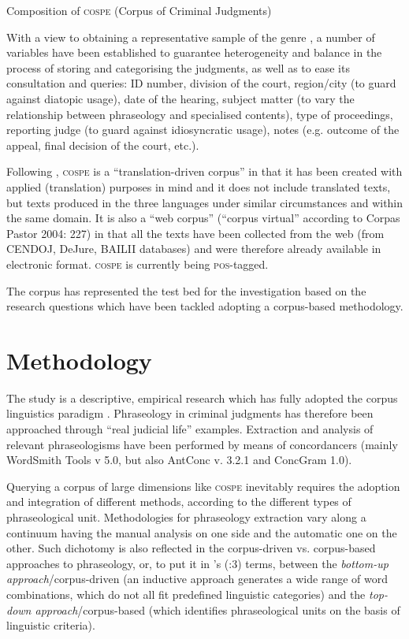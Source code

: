 \documentclass[output=paper]{LSP/langsci}
\begin{document}
\begin{table}
\caption{Composition of \textsc{cospe} (Corpus of Criminal Judgments)}
     \label{tab:6.3}
\end{table} 

With a view to obtaining a representative sample of the genre \citep[see][243]{Biber1993}, a number of variables have been established to guarantee heterogeneity and balance in the process of storing and categorising the judgments, as well as to ease its consultation and queries: ID number, division of the court, region/city (to guard against diatopic usage), date of the hearing, subject matter (to vary the relationship between phraseology and specialised contents), type of proceedings, reporting judge (to guard against idiosyncratic usage), notes (e.g. outcome of the appeal, final decision of the court, etc.).

Following \citet[105-107]{Zanettin2012}, \textsc{cospe} is a “translation-driven corpus” in that it has been created with applied (translation) purposes in mind and it does not include translated texts, but texts produced in the three languages under similar circumstances and within the same domain. It is also a “web corpus” (“corpus virtual” according to Corpas Pastor 2004: 227) in that all the texts have been collected from the web (from CENDOJ, DeJure, BAILII databases) and were therefore already available in electronic format. \textsc{cospe} is currently being \textsc{pos}-tagged.

The corpus has represented the test bed for the investigation based on the research questions which have been tackled adopting a corpus-based methodology.

\section{Methodology}
The study is a descriptive, empirical research which has fully adopted the corpus linguistics paradigm \citep[see][]{McEnery2006}. Phraseology in criminal judgments has therefore been approached through “real judicial life” examples. Extraction and analysis of relevant phraseologisms have been performed by means of concordancers (mainly WordSmith Tools v 5.0, but also AntConc v. 3.2.1 and ConcGram 1.0).

Querying a corpus of large dimensions like \textsc{cospe} inevitably requires the adoption and integration of different methods, according to the different types of phraseological unit. Methodologies for phraseology extraction vary along a continuum having the manual analysis on one side and the automatic one on the other. Such dichotomy is also reflected in the corpus-driven vs. corpus-based approaches to phraseology, or, to put it in \citeauthor{Granger2005}'s (\citeyear{Granger2005}:3) terms, between the \textit{bottom-up approach}/corpus-driven (an inductive approach generates a wide range of word combinations, which do not all fit predefined linguistic categories) and the \textit{top-down approach}/corpus-based (which identifies phraseological units on the basis of linguistic criteria).
\end{document}

